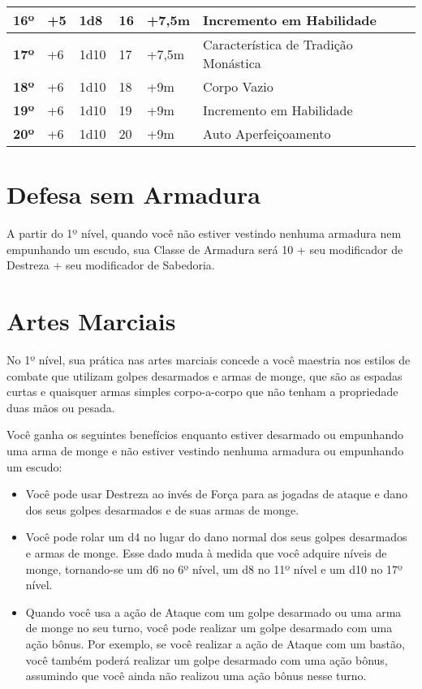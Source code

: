 \begin{center}
\begin{tabular}{
        | b{8mm}<{\centering}
        b{23mm}<{\centering}
        b{18mm}<{\centering}
        b{15mm}<{\centering}
        b{30mm}<{\centering}
        p{70mm}<{\raggedright\arraybackslash} |
}
    \hline
    \textbf{16º} & +5 & 1d8 & 16 & +7,5m & Incremento em Habilidade \\
    \hline
    \textbf{17º} & +6 & 1d10 & 17 & +7,5m & Característica de Tradição
        Monástica \\
    \hline
    \textbf{18º} & +6 & 1d10 & 18 & +9m & Corpo Vazio \\
    \hline
    \textbf{19º} & +6 & 1d10 & 19 & +9m & Incremento em Habilidade \\
    \hline
    \textbf{20º} & +6 & 1d10 & 20 & +9m & Auto Aperfeiçoamento \\
    \hline
\end{tabular}
\end{center}

\begin{multicols}{2}

\section*{Defesa sem Armadura}%

A partir do 1º nível, quando você não estiver vestindo nenhuma armadura nem
empunhando um escudo, sua Classe de Armadura será 10 + seu modificador de
Destreza + seu modificador de Sabedoria.

\section*{Artes Marciais}%

No 1º nível, sua prática nas artes marciais concede a você maestria nos estilos
de combate que utilizam golpes desarmados e armas de monge, que são as espadas
curtas e quaisquer armas simples corpo-a-corpo que não tenham a propriedade duas
mãos ou pesada.

Você ganha os seguintes benefícios enquanto estiver desarmado ou empunhando uma
arma de monge e não estiver vestindo nenhuma armadura ou empunhando um escudo:

\begin{itemize}
    \item Você pode usar Destreza ao invés de Força para as jogadas de ataque e
        dano dos seus golpes desarmados e de suas armas de monge.
    \item Você pode rolar um d4 no lugar do dano normal dos seus golpes
        desarmados e armas de monge. Esse dado muda à medida que você adquire
        níveis de monge, tornando-se um d6 no 6º nível, um d8 no 11º nível e um
        d10 no 17º nível.
    \item Quando você usa a ação de Ataque com um golpe desarmado ou uma arma de
        monge no seu turno, você pode realizar um golpe desarmado com uma ação
        bônus. Por exemplo, se você realizar a ação de Ataque com um bastão,
        você também poderá realizar um golpe desarmado com uma ação bônus,
        assumindo que você ainda não realizou uma ação bônus nesse turno.
\end{itemize}


\end{multicols}
